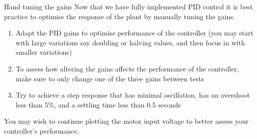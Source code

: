 \documentclass[9pt]{beamer-control}
\begin{document}
\begin{frame}{Hand tuning the gains}
  Now that we have fully implemented PID control it is best practice to optimise the response of the plant by manually tuning the gains.

  \begin{enumerate}
    \item Adapt the PID gains to optimise performance of the controller (you may start with large variations say doubling or halving values, and then focus in with smaller variations)
    \item To assess how altering the gains affects the performance of the controller, make sure to only change one of the three gains between tests
    \item Try to achieve a step response that has minimal oscillation, has an overshoot less than 5\%, and a settling time less than 0.5 seconds
  \end{enumerate}
  You may wish to continue plotting the motor input voltage to better assess your controller's performance.


\end{frame}
\end{document}
